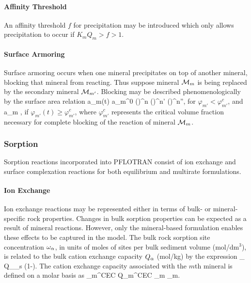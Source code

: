 \paragraph{Affinity Threshold}

An affinity threshold $f$ for precipitation may be introduced which only allows precipitation to occur if $K_m Q_m > f > 1$.

\paragraph{Surface Armoring}

Surface armoring occurs when one mineral precipitates on top of another mineral, blocking that mineral from reacting. Thus suppose mineral ${\mathcal M}_m$ is being replaced by the secondary mineral ${\mathcal M}_{m'}$. Blocking may be described phenomenologically by the surface area relation
\EQ\label{surface_armoring}
a_m(t) \eq a_m^0  \left(\right)^n  \left(\right)^{n'} \left(\right)^{n''},
\EN
for $\varphi_{m'} < \varphi_{m'}^c$, and 
\EQ
a_m ,
\EN
if $\varphi_{m'}(t) \geq \varphi_{m'}^c$, where $\varphi_{m'}^c$ represents the critical volume fraction necessary for complete blocking of the reaction of mineral ${\mathcal M}_m$.

\subsubsection{Sorption}

Sorption reactions incorporated into PFLOTRAN consist of ion exchange and surface complexation reactions for both equilibrium and multirate formulations.

\paragraph{Ion Exchange}

Ion exchange reactions may be represented either in terms of bulk- or mineral-specific rock properties.  Changes in bulk sorption properties can be expected as a result of mineral reactions.  However, only the mineral-based formulation enables these effects to be captured in the model.  The bulk rock sorption site concentration $\omega_{\alpha}$, in units of moles of sites per bulk sediment volume (mol/dm$^3$), is related to the bulk cation exchange capacity $Q_{\alpha}$ (mol/kg) by the expression
\EQ
\omega_\a \eq {} \eq {}   \eq Q_\a \rho_s (1-\phi).
\EN
The cation exchange capacity associated with the $m$th mineral is defined on a molar basis as
\EQ
\omega_m^{\rm CEC} \eq {} \eq {}   \eq Q_m^{\rm CEC} \rho_m \phi_m.
\EN


